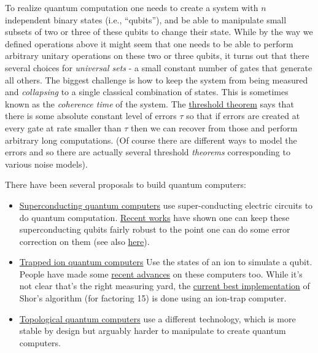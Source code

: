 To realize quantum computation one needs to create a system with \(n\)
independent binary states (i.e., ``qubits''), and be able to manipulate
small subsets of two or three of these qubits to change their state.
While by the way we defined operations above it might seem that one
needs to be able to perform arbitrary unitary operations on these two or
three qubits, it turns out that there several choices for
\emph{universal sets} - a small constant number of gates that generate
all others. The biggest challenge is how to keep the system from being
measured and \emph{collapsing} to a single classical combination of
states. This is sometimes known as the \emph{coherence time} of the
system. The
\href{https://courses.cs.washington.edu/courses/cse599d/06wi/lecturenotes19.pdf}{threshold
theorem} says that there is some absolute constant level of errors
\(\tau\) so that if errors are created at every gate at rate smaller
than \(\tau\) then we can recover from those and perform arbitrary long
computations. (Of course there are different ways to model the errors
and so there are actually several threshold \emph{theorems}
corresponding to various noise models).

There have been several proposals to build quantum computers:

\begin{itemize}
\item
  \href{https://en.wikipedia.org/wiki/Superconducting_quantum_computing}{Superconducting
  quantum computers} use super-conducting electric circuits to do
  quantum computation. \href{http://arxiv.org/abs/1411.7403}{Recent
  works} have shown one can keep these superconducting qubits fairly
  robust to the point one can do some error correction on them (see also
  \href{http://arxiv.org/abs/1508.05882v2}{here}).
\item
  \href{https://en.wikipedia.org/wiki/Trapped_ion_quantum_computer}{Trapped
  ion quantum computers} Use the states of an ion to simulate a qubit.
  People have made some
  \href{http://iontrap.umd.edu/wp-content/uploads/2016/02/1602.02840v1.pdf}{recent
  advances} on these computers too. While it's not clear that's the
  right measuring yard, the
  \href{http://arxiv.org/abs/1507.08852}{current best implementation} of
  Shor's algorithm (for factoring 15) is done using an ion-trap
  computer.
\item
  \href{https://en.wikipedia.org/wiki/Topological_quantum_computer}{Topological
  quantum computers} use a different technology, which is more stable by
  design but arguably harder to manipulate to create quantum computers.
\end{itemize}

